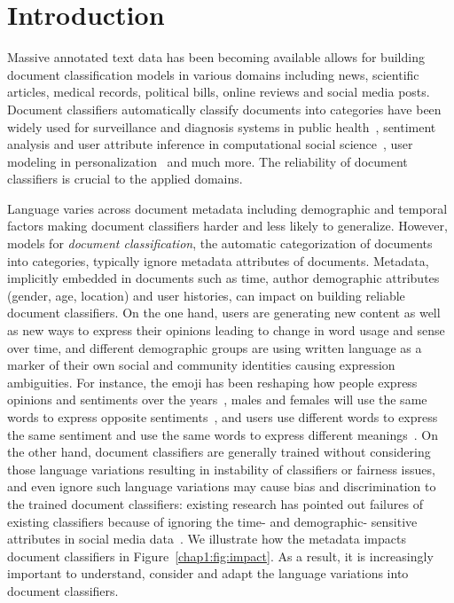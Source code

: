 \chapter{Introduction}
\label{chp:intro}

Massive annotated text data has been becoming available allows for building document classification models in various domains including news, scientific articles, medical records, political bills, online reviews and social media posts.
Document classifiers automatically classify documents into categories have been widely used for surveillance and diagnosis systems in public health~\cite{lamb2013separating, de2016discovering, huang2019can, zhu2019detecting}, sentiment analysis and user attribute inference in computational social science~\cite{rosenthal2011age, yang2016hierarchical, huang2017exploring, heindorf2019debiasing}, user modeling in personalization~\cite{tang2015learning, wu2016personalized, huang2019neuraluser, pan2019social} and much more. 
The reliability of document classifiers is crucial to the applied domains.


Language varies across document metadata including demographic and temporal factors making document classifiers harder and less likely to generalize. 
However, models for \textit{document classification}, the automatic categorization of documents into categories, typically ignore metadata attributes of documents. 
Metadata, implicitly embedded in documents such as time, author demographic attributes (gender, age, location) and user histories, can impact on building reliable document classifiers.
On the one hand, users are generating new content as well as new ways to express their opinions leading to change in word usage and sense over time, and different demographic groups are using written language as a marker of their own social and community identities causing expression ambiguities.
For instance, the emoji has been reshaping how people express opinions and sentiments over the years~\cite{felbo2017using}, males and females will use the same words to express opposite sentiments~\cite{volkova2013exploring}, and users use different words to express the same sentiment and use the same words to express different meanings~\cite{oba2019modeling}. %
On the other hand, document classifiers are generally trained without considering those language variations resulting in instability of classifiers or fairness issues, and even ignore such language variations may cause bias and discrimination to the trained document classifiers: existing research has pointed out failures of existing classifiers because of ignoring the time- and demographic- sensitive attributes in social media data~\cite{gayo2011limits, gayo2013predicting}.
We illustrate how the metadata impacts document classifiers in Figure~\ref{chap1:fig:impact}.
As a result, it is increasingly important to understand, consider and adapt the language variations into document classifiers.


